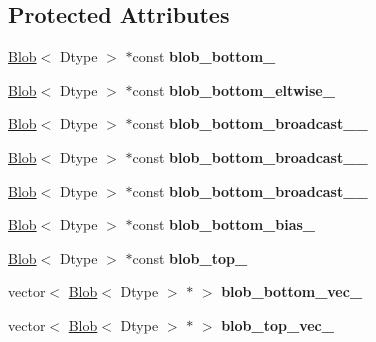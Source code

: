 \subsection*{Protected Attributes}
\begin{DoxyCompactItemize}
\item 
\mbox{\label{classcaffe_1_1_bias_layer_test_affc748f42547136854eca4a38d809339}} 
\mbox{\hyperlink{classcaffe_1_1_blob}{Blob}}$<$ Dtype $>$ $\ast$const {\bfseries blob\+\_\+bottom\+\_\+}
\item 
\mbox{\label{classcaffe_1_1_bias_layer_test_a5f195a13d81458080beb4ad2bf3c507f}} 
\mbox{\hyperlink{classcaffe_1_1_blob}{Blob}}$<$ Dtype $>$ $\ast$const {\bfseries blob\+\_\+bottom\+\_\+eltwise\+\_\+}
\item 
\mbox{\label{classcaffe_1_1_bias_layer_test_a74306af4229b7d50ba9d7f732bc15e61}} 
\mbox{\hyperlink{classcaffe_1_1_blob}{Blob}}$<$ Dtype $>$ $\ast$const {\bfseries blob\+\_\+bottom\+\_\+broadcast\+\_\+\_\+}
\item 
\mbox{\label{classcaffe_1_1_bias_layer_test_a74f3f84019f07784dca0a92e7f35d920}} 
\mbox{\hyperlink{classcaffe_1_1_blob}{Blob}}$<$ Dtype $>$ $\ast$const {\bfseries blob\+\_\+bottom\+\_\+broadcast\+\_\+\_\+}
\item 
\mbox{\label{classcaffe_1_1_bias_layer_test_ac90c1fd44afb23b15cc7d4c7fc2edc65}} 
\mbox{\hyperlink{classcaffe_1_1_blob}{Blob}}$<$ Dtype $>$ $\ast$const {\bfseries blob\+\_\+bottom\+\_\+broadcast\+\_\+\_\+}
\item 
\mbox{\label{classcaffe_1_1_bias_layer_test_a40d6940a907bf9a24ea2abcdea0404af}} 
\mbox{\hyperlink{classcaffe_1_1_blob}{Blob}}$<$ Dtype $>$ $\ast$const {\bfseries blob\+\_\+bottom\+\_\+bias\+\_\+}
\item 
\mbox{\label{classcaffe_1_1_bias_layer_test_a59aa5572e89e328cd12052dec59e8565}} 
\mbox{\hyperlink{classcaffe_1_1_blob}{Blob}}$<$ Dtype $>$ $\ast$const {\bfseries blob\+\_\+top\+\_\+}
\item 
\mbox{\label{classcaffe_1_1_bias_layer_test_ad53f42f19c73bc4b1d7890438b1d6876}} 
vector$<$ \mbox{\hyperlink{classcaffe_1_1_blob}{Blob}}$<$ Dtype $>$ $\ast$ $>$ {\bfseries blob\+\_\+bottom\+\_\+vec\+\_\+}
\item 
\mbox{\label{classcaffe_1_1_bias_layer_test_af524047ad4a0f0d995ff75bcab80166e}} 
vector$<$ \mbox{\hyperlink{classcaffe_1_1_blob}{Blob}}$<$ Dtype $>$ $\ast$ $>$ {\bfseries blob\+\_\+top\+\_\+vec\+\_\+}
\end{DoxyCompactItemize}
